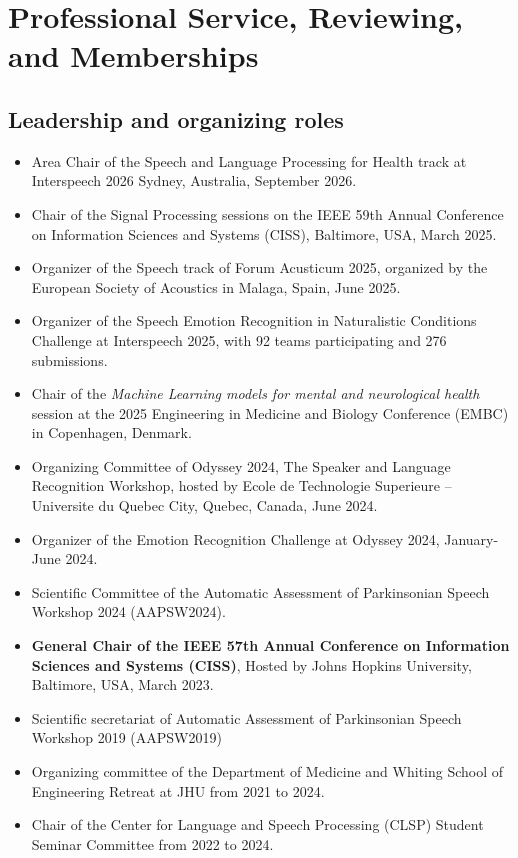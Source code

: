 \section{Professional Service, Reviewing, and Memberships}

\subsection{Leadership and organizing roles}
\begin{itemize}
  \item Area Chair of the Speech and Language Processing for Health track at Interspeech 2026 Sydney, Australia, September 2026.
  \item Chair of the Signal Processing sessions on the IEEE 59th Annual Conference on Information Sciences and Systems (CISS), Baltimore, USA, March 2025.
  \item Organizer of the Speech track of Forum Acusticum 2025, organized by the European Society of Acoustics in Malaga, Spain, June 2025.
  \item Organizer of the Speech Emotion Recognition in Naturalistic Conditions Challenge at Interspeech 2025, with 92 teams participating and 276 submissions.

  \item Chair of the \textit{Machine Learning models for mental and neurological health} session at the 2025 Engineering in Medicine and Biology Conference (EMBC) in Copenhagen, Denmark.
  
  \item Organizing Committee of Odyssey 2024, The Speaker and Language Recognition Workshop, hosted by Ecole de Technologie Superieure – Universite du Quebec City, Quebec, Canada, June 2024.
  \item Organizer of the Emotion Recognition Challenge at Odyssey 2024, January-June 2024.
  \item Scientific Committee of the Automatic Assessment of Parkinsonian Speech Workshop 2024 (AAPSW2024).
  \item \textbf{General Chair of the IEEE 57th Annual Conference on Information Sciences and Systems (CISS)}, Hosted by Johns Hopkins University, Baltimore, USA, March 2023.
  \item Scientific secretariat of Automatic Assessment of Parkinsonian Speech Workshop 2019 (AAPSW2019)
  \item Organizing committee of the Department of Medicine and Whiting School of Engineering Retreat at JHU from 2021 to 2024.
  \item Chair of the Center for Language and Speech Processing (CLSP) Student Seminar Committee from 2022 to 2024.
\end{itemize}

